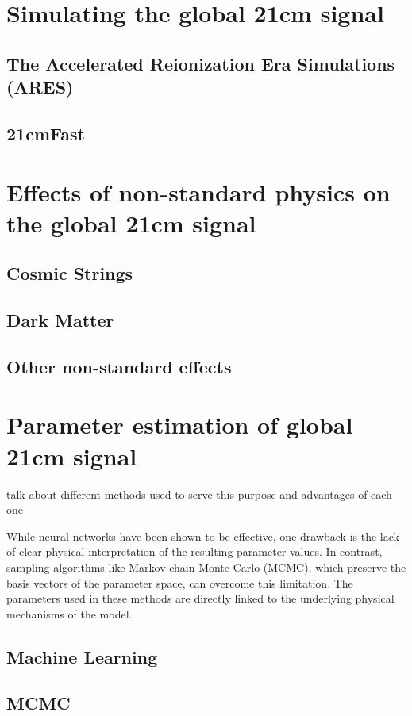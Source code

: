\documentclass[12pt, TexShade, letterpaper]{report}
\begin{document}
\section{Simulating the global 21cm signal}
\subsection{The Accelerated Reionization Era Simulations (ARES)}
\subsection{21cmFast}
\section{Effects of non-standard physics on the global 21cm signal}
\label{chap:global21cm,sub:non_standard}
\subsection{Cosmic Strings}
\subsection{Dark Matter}
\subsection{Other non-standard effects}
\section{Parameter estimation of global 21cm signal}
\label{chap:global21cm,sub:parameter_estimation}
talk about different methods used to serve this purpose and advantages of each one\par
While neural networks have been shown to be effective, one drawback is the lack of clear physical interpretation of the resulting parameter values. In contrast, sampling algorithms like Markov chain Monte Carlo (MCMC), which preserve the basis vectors of the parameter space, can overcome this limitation. The parameters used in these methods are directly linked to the underlying physical mechanisms of the model.
\subsection{Machine Learning}
\subsection{MCMC}
\end{document}
